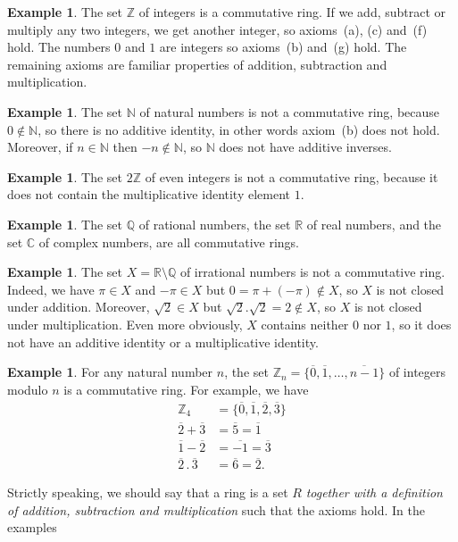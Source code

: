\documentclass{amsart}
\newcommand{\Z}         {{\mathbb{Z}}}
\newcommand{\Q}         {{\mathbb{Q}}}
\newcommand{\R}         {{\mathbb{R}}}
\newcommand{\sm}        {\setminus}
\newcommand{\N}         {{\mathbb{N}}}
\newcommand{\C}         {{\mathbb{C}}}
\newcommand{\ov}[1]     {\overline{#1}}
\renewcommand{\:}{\colon}
\theoremstyle{definition}
\newtheorem{example}[theorem]{Example}
\begin{document}
\begin{example}
 The set $\Z$ of integers is a commutative ring.  If we add, subtract
 or multiply any two integers, we get another integer, so axioms~(a),
 (c) and~(f) hold.  The numbers $0$ and $1$ are integers so axioms~(b)
 and~(g) hold.  The remaining axioms are familiar properties of
 addition, subtraction and multiplication.
\end{example}
\begin{example}
 The set $\N$ of natural numbers is not a commutative ring, because
 $0\not\in\N$, so there is no additive identity, in other words
 axiom~(b) does not hold.  Moreover, if $n\in\N$ then $-n\not\in\N$,
 so $\N$ does not have additive inverses.
\end{example}
\begin{example}
 The set $2\Z$ of even integers is not a commutative ring, because
 it does not contain the multiplicative identity element $1$.
\end{example}
\begin{example}
 The set $\Q$ of rational numbers, the set $\R$ of real numbers, and
 the set $\C$ of complex numbers, are all commutative rings.
\end{example}
\begin{example}
 The set $X=\R\sm\Q$ of irrational numbers is not a commutative ring.
 Indeed, we have $\pi\in X$ and $-\pi\in X$ but
 $0=\pi+(-\pi)\not\in X$, so $X$ is not closed under addition.
 Moreover, $\sqrt{2}\in X$ but $\sqrt{2}.\sqrt{2}=2\not\in X$, so $X$
 is not closed under multiplication.  Even more obviously, $X$
 contains neither $0$ nor $1$, so it does not have an additive
 identity or a multiplicative identity.
\end{example}
\begin{example}\label{eg-Zn}
 For any natural number $n$, the set
 $\Z_n=\{\ov{0},\ov{1},\ldots,\ov{n-1}\}$ of integers modulo $n$ is a
 commutative ring.  For example, we have
 \begin{align*}
  \Z_4 &= \{\ov{0},\ov{1},\ov{2},\ov{3}\}  \\
  \ov{2} + \ov{3} &= \ov{5} = \ov{1} \\
  \ov{1} - \ov{2} &= \ov{-1} = \ov{3} \\
  \ov{2} \,.\, \ov{3} &= \ov{6} = \ov{2}.  
 \end{align*}
\end{example}
Strictly speaking, we should say that a ring is a set $R$
\emph{together with a definition of addition, subtraction and
  multiplication} such that the axioms hold.  In the examples
\end{document}
